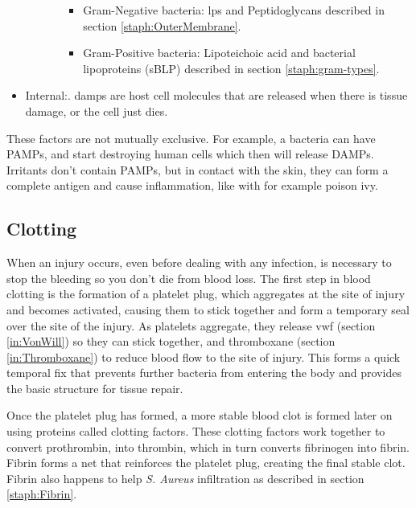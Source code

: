 \begin{itemize}
\begin{itemize}
\begin{itemize}
\begin{itemize}
                            \item Gram-Negative bacteria: \gls{lps} and Peptidoglycans described in section \ref{staph:OuterMembrane}.
                            
                            \item Gram-Positive bacteria: Lipoteichoic acid and bacterial lipoproteins (sBLP) described in section \ref{staph:gram-types}.

                        \end{itemize}

                \end{itemize}

        \end{itemize}

    \item {Internal:}. \gls{damps} are host cell molecules that are released when there is tissue damage, or the cell just dies.
            
\end{itemize}

These factors are not mutually exclusive. For example, a bacteria can have PAMPs, and start destroying human cells which then will release DAMPs. Irritants don't contain PAMPs, but in contact with the skin, they can form a complete antigen and cause inflammation, like with for example poison ivy.

\subsection{Clotting}

When an injury occurs, even before dealing with any infection, is necessary to stop the bleeding so you don't die from blood loss. The first step in blood clotting is the formation of a platelet plug, which aggregates at the site of injury and becomes activated, causing them to stick together and form a temporary seal over the site of the injury. As platelets aggregate, they release \gls{vwf} (section \ref{in:VonWill}) so they can stick together, and thromboxane (section \ref{in:Thromboxane}) to reduce blood flow to the site of injury. This forms a quick temporal fix that prevents further bacteria from entering the body and provides the basic structure for tissue repair.

Once the platelet plug has formed, a more stable blood clot is formed later on using proteins called clotting factors. These clotting factors work together to convert prothrombin, into thrombin, which in turn converts fibrinogen into fibrin. Fibrin forms a net that reinforces the platelet plug, creating the final stable clot. Fibrin also happens to help \textit{S. Aureus} infiltration as described in section \ref{staph:Fibrin}.

